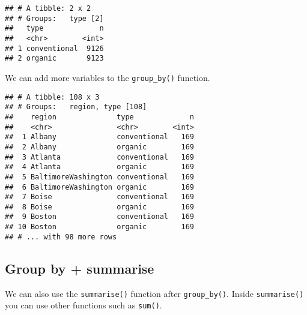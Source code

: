 \documentclass[]{book}
\newenvironment{Shaded}{\begin{snugshade}}{\end{snugshade}}
\newcommand{\DataTypeTok}[1]{\textcolor[rgb]{0.13,0.29,0.53}{#1}}
\newcommand{\KeywordTok}[1]{\textcolor[rgb]{0.13,0.29,0.53}{\textbf{#1}}}
\newcommand{\NormalTok}[1]{#1}
\newcommand{\OperatorTok}[1]{\textcolor[rgb]{0.81,0.36,0.00}{\textbf{#1}}}
\newcommand{\StringTok}[1]{\textcolor[rgb]{0.31,0.60,0.02}{#1}}
\begin{document}
\begin{verbatim}
## # A tibble: 2 x 2
## # Groups:   type [2]
##   type             n
##   <chr>        <int>
## 1 conventional  9126
## 2 organic       9123
\end{verbatim}

We can add more variables to the \texttt{group\_by()} function.

\begin{Shaded}
\end{Shaded}

\begin{verbatim}
## # A tibble: 108 x 3
## # Groups:   region, type [108]
##    region              type             n
##    <chr>               <chr>        <int>
##  1 Albany              conventional   169
##  2 Albany              organic        169
##  3 Atlanta             conventional   169
##  4 Atlanta             organic        169
##  5 BaltimoreWashington conventional   169
##  6 BaltimoreWashington organic        169
##  7 Boise               conventional   169
##  8 Boise               organic        169
##  9 Boston              conventional   169
## 10 Boston              organic        169
## # ... with 98 more rows
\end{verbatim}

\hypertarget{group-by-summarise}{%
\subsection{Group by + summarise}\label{group-by-summarise}}

We can also use the \texttt{summarise()} function after \texttt{group\_by()}. Inside \texttt{summarise()} you can use other functions such as \texttt{sum()}.

\begin{Shaded}
\end{Shaded}
\end{document}
